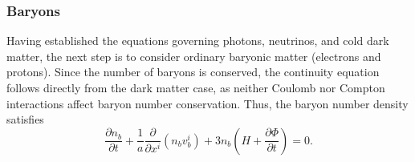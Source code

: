 \documentclass{aa}
\numberwithin{equation}{section}
\numberwithin{table}{section}
\numberwithin{figure}{section}
\begin{document}




\subsubsection{Baryons}
Having established the equations governing photons, neutrinos, and cold dark matter, the next step is to consider ordinary baryonic matter (electrons and protons). 
Since the number of baryons is conserved, the continuity equation follows directly from the dark matter case, as neither Coulomb nor Compton interactions affect baryon number conservation. Thus, the baryon number density satisfies
\begin{equation}
    \frac{\partial n_b}{\partial t} + \frac{1}{a} \frac{\partial}{\partial x^i} \left(n_b v_b^i\right) + 3n_b \left( H + \frac{\partial \Phi}{\partial t} \right) = 0.
\end{equation}
\end{document}
